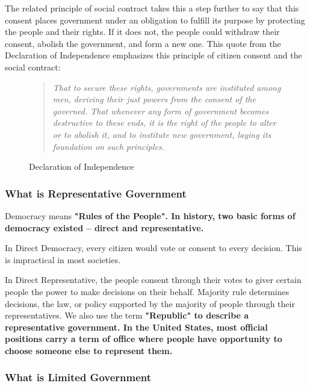 The related principle of social contract takes this a step further to say that
this consent places government under an obligation to fulfill its purpose by
protecting the people and their rights. If it does not, the people could
withdraw their consent, abolish the government, and form a new one. This quote
from the Declaration of Independence emphasizes this principle of citizen
consent and the social contract:

\begin{figure}
    \begin{quote}
        \it{That to secure these rights, governments are instituted among men, deriving
        their just powers from the consent of the governed. That whenever any form of
        government becomes destructive to these ends, it is the right of the people
        to alter or to abolish it, and to institute new government, laying its
        foundation on such principles.}
    \end{quote}
    \caption{Declaration of Independence}
\end{figure}


\subsubsection*{What is Representative Government}

Democracy means \bf{"Rules of the People"}. In history, two basic forms of
democracy existed -- direct and representative.

\begin{definition}
  In Direct Democracy, every citizen would vote or consent to every decision.
  This is impractical in most societies.
\end{definition}

\begin{definition}
  In Direct Representative, the people consent through their votes to giver
  certain people the power to make decisions on their behalf. Majority rule
  determines decisions, the law, or policy supported by the majority of people
  through their representatives. We also use the term \bf{"Republic"} to
  describe a representative government. In the United States, most official
  positions carry a term of office where people have opportunity to choose
  someone else to represent them.
\end{definition}

\subsubsection*{What is Limited Government}

